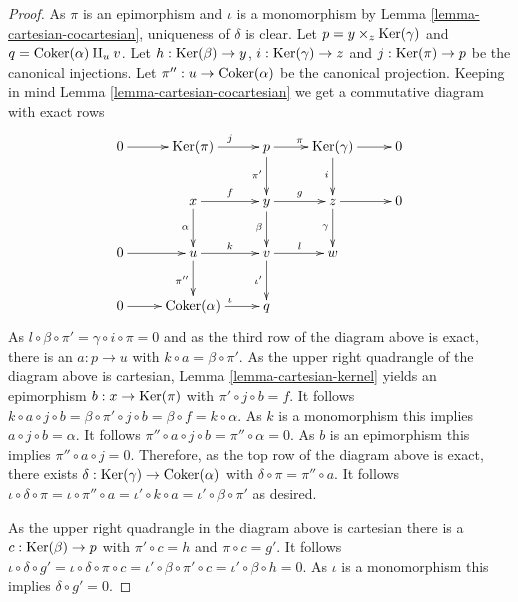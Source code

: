 \begin{proof}
As $\pi$ is an epimorphism and $\iota$ is a monomorphism by
Lemma \ref{lemma-cartesian-cocartesian}, uniqueness of $\delta$ is clear.
Let $p = y \times_z \mathop{\mathrm{Ker}}(\gamma)$ and $q = \mathop{\mathrm{Coker}}(\alpha) \amalg_u v$.
Let $h : \mathop{\mathrm{Ker}}(\beta) \to y$, $i : \mathop{\mathrm{Ker}}(\gamma) \to z$ and
$j : \mathop{\mathrm{Ker}}(\pi) \to p$ be the canonical injections.
Let $\pi'' : u \to \mathop{\mathrm{Coker}}(\alpha)$ be the canonical projection.
Keeping in mind Lemma \ref{lemma-cartesian-cocartesian} we get a commutative
diagram with exact rows
$$
\xymatrix{
0 \ar[r] &
\Ker(\pi) \ar[r]^j &
p \ar[r]^{\pi} \ar[d]_{\pi'} &
\Ker(\gamma) \ar[d]_i \ar[r] & 0 \\
& x \ar[r]^f \ar[d]_\alpha & y \ar[r]^g \ar[d]_\beta &
z \ar[d]_\gamma \ar[r] & 0 \\
0 \ar[r] & u \ar[r]^k \ar[d]_{\pi''} &
v \ar[r]^l \ar[d]_{\iota'} & w & \\
0 \ar[r] & \Coker(\alpha) \ar[r]^\iota & q & &
}
$$
As $l \circ \beta \circ \pi' = \gamma \circ i \circ \pi = 0$ and as the third
row of the diagram above is exact, there is an $a : p \to u$
with $k \circ a = \beta \circ \pi'$. As the upper right quadrangle of the
diagram above is cartesian, Lemma \ref{lemma-cartesian-kernel} yields an
epimorphism $b : x \to \mathop{\mathrm{Ker}}(\pi)$ with $\pi' \circ j \circ b = f$.
It follows
$k \circ a \circ j \circ b = \beta \circ \pi' \circ j \circ b =
\beta \circ f = k \circ \alpha$.
As $k$ is a monomorphism this implies $a \circ j \circ b = \alpha$. It follows
$\pi'' \circ a \circ j \circ b = \pi'' \circ \alpha = 0$. As $b$ is an
epimorphism this
implies $\pi'' \circ a \circ j = 0$. Therefore, as the top row of the diagram
above is exact, there exists
$\delta : \mathop{\mathrm{Ker}}(\gamma) \to \mathop{\mathrm{Coker}}(\alpha)$ with
$\delta \circ \pi = \pi'' \circ a$. It follows
$\iota \circ \delta \circ \pi = \iota \circ \pi'' \circ a =
\iota' \circ k \circ a = \iota' \circ \beta \circ \pi'$
as desired.

\medskip\noindent
As the upper right quadrangle in the diagram above is cartesian there
is a $c : \mathop{\mathrm{Ker}}(\beta) \to p$ with $\pi' \circ c = h$ and $\pi \circ c = g'$.
It follows
$\iota \circ \delta \circ g' = \iota \circ \delta \circ \pi \circ c =
\iota' \circ \beta \circ \pi' \circ c = \iota' \circ \beta \circ h = 0$.
As $\iota$ is a monomorphism this implies $\delta \circ g' = 0$.


\end{proof}
